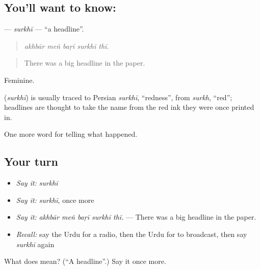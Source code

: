 \subsection*{You'll want to know: }
\textbf{} — \emph{surkhī} — \textquotedblleft{}a headline\textquotedblright{}.

\begin{quote}
    
\end{quote}

\begin{quote}
\emph{akhbār meṅ baṛī surkhī thī.}
\end{quote}

\begin{quote}
There was a big headline in the paper.
\end{quote}

Feminine.

\begin{cousinweb}
\textbf{} (\emph{surkhī}) is usually traced to Persian \emph{surkhī}, \textquotedblleft{}redness\textquotedblright{}, from \emph{surkh}, \textquotedblleft{}red\textquotedblright{}; headlines are thought to take the name from the red ink they were once printed in.
\end{cousinweb}

\begin{grammarlens}[title={What you've built}]
One more word for telling what happened.
\end{grammarlens}

\subsection*{Your turn}
\begin{itemize}
\raggedright
  \item \emph{Say it:} \emph{surkhī}
  \item \emph{Say it:} \emph{surkhī}, once more
  \item \emph{Say it:} \emph{akhbār meṅ baṛī surkhī thī.} — There was a big headline in the paper.
  \item \emph{Recall:} say the Urdu for a radio, then the Urdu for to broadcast, then say \emph{surkhī} again
\end{itemize}

\begin{tcolorbox}[breakable,colback=teal!4,colframe=teal!35!black,title={Before you move on}]
What does  mean? (\textquotedblleft{}A headline\textquotedblright{}.) Say it once more.
\end{tcolorbox}

